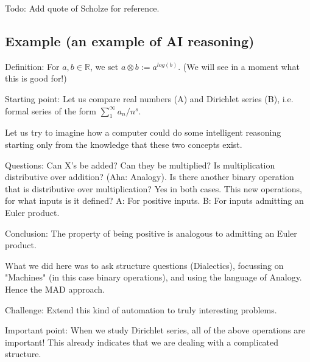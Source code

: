 \documentclass[paper=a4, fontsize=11pt]{scrartcl} %
\numberwithin{equation}{section} %
\numberwithin{figure}{section} %
\numberwithin{table}{section} %
\begin{document}
Todo: Add quote of Scholze for reference.


\subsection{Example (an example of AI reasoning)}
Definition: For $a, b \in \mathbb{R}$, we set $a \otimes b := a^{log(b)}$. (We will see in a moment what this is good for!)

Starting point: Let us compare real numbers (A) and Dirichlet series (B), i.e. formal series of the form $\sum_1^{\infty
} a_n/n^s$.

Let us try to imagine how a computer could do some intelligent reasoning starting only from the knowledge that these two concepts exist.

Questions: Can X's be added? Can they be multiplied? Is multiplication distributive over addition? (Aha: Analogy). Is there another binary operation that is distributive over multiplication? Yes in both cases. This new operations, for what inputs is it defined? A: For positive inputs. B: For inputs admitting an Euler product.

Conclusion: The property of being positive is analogous to admitting an Euler product.

What we did here was to ask structure questions (Dialectics), focussing on "Machines" (in this case binary operations), and using the language of Analogy. Hence the MAD approach.

Challenge: Extend this kind of automation to truly interesting problems.

Important point: When we study Dirichlet series, all of the above operations are important! This already indicates that we are dealing with a complicated structure.
\end{document}
